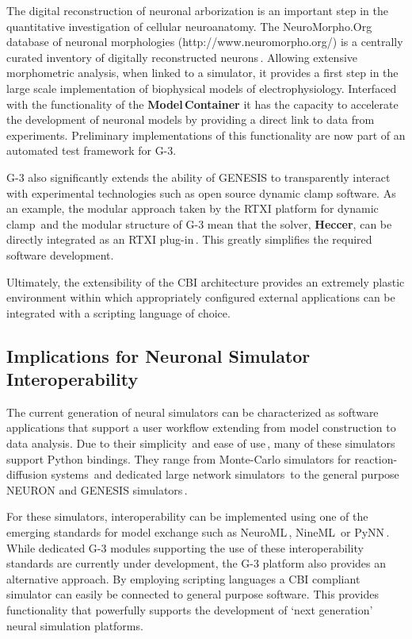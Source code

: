 \documentclass[10pt]{article}
\begin{document}
The digital reconstruction of neuronal arborization is an important step in the
quantitative investigation of cellular neuroanatomy.  The NeuroMorpho.Org database of neuronal morphologies
(http://www.neuromorpho.org/) is a centrally curated inventory of
digitally reconstructed neurons\,\cite{ascoli06:_mobil}.  Allowing
extensive morphometric analysis, when linked to a simulator, it provides a first step in the large scale
implementation of biophysical models of electrophysiology.  Interfaced with the functionality of the {\bf Model\,Container} it has the capacity to
accelerate the development of neuronal models by providing a direct
link to data from experiments.  Preliminary implementations of this
functionality are now part of an automated test framework for G-3.

G-3 also significantly extends the ability of GENESIS to transparently
interact with experimental technologies such as open source dynamic
clamp software.  As an example, the modular approach taken by the RTXI
platform for dynamic
clamp\,\cite{bettencourt08:_effec_imper_dynam_clamp, dorval01:_real}
and the modular structure of G-3 mean that the solver, {\bf Heccer},
can be directly integrated as an RTXI
plug-in\,\cite{cornelis10:_realt_rtxi_genes}.  This greatly simplifies
the required software development.

Ultimately, the extensibility of the CBI 
architecture provides an extremely plastic environment within which
appropriately configured external applications can be integrated with a scripting language of
choice.

\subsection*{Implications for Neuronal Simulator Interoperability}

The current generation of neural simulators can be characterized as
software applications that support a user workflow extending from
model construction to data analysis.  Due to their simplicity\,\cite{goodman08:_brian} and ease of use\,\cite{pecevski09:_pcsim}, many of these simulators support Python bindings. 
They range from Monte-Carlo
simulators for reaction-diffusion systems\,\cite{wils09:_steps} and
dedicated large network simulators\,\cite{eppler08:_pynes} to the
general purpose NEURON and GENESIS
simulators\,\cite{hines09:_neuron_python, bower98:_book_genes}.

For these simulators, interoperability can be implemented using
one of the emerging standards for model exchange such as
NeuroML\,\cite{nigel01:_towar_neurom},
NineML\,\cite{gortechnikov10:_ninem_user_layer} or
PyNN\,\cite{davison08:_pynn}.  While dedicated G-3 modules supporting
the use of these interoperability standards are currently under
development, the G-3 platform also provides an alternative
approach. By employing scripting languages a CBI 
compliant simulator can easily be connected to general purpose software. 
This provides functionality that powerfully supports the development of 
`next generation' neural simulation platforms.
\end{document}
